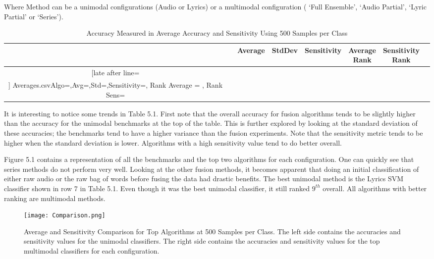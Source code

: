  Where Method can be a unimodal configurations (Audio or Lyrics) or a multimodal configuration 
 ( \lq Full Ensemble',  \lq Audio Partial', \lq Lyric Partial' or \lq Series').
 
\begin{table}
\centering
\footnotesize{
	\hskip-1.0in
	  \caption{Accuracy Measured in Average Accuracy and Sensitivity Using 500 Samples per Class }
	\begin{tabular}{| c | l | c | l | c  ||  c | c | c}\hline%
	& & Average & StdDev & Sensitivity &\pbox{20cm}{ Average\\ Rank \\} & \pbox{20cm}{ Sensitivity\\ Rank \\} \\\hline \csvreader[late after line=\\\hline]%
	{Averages.csv}{Algo=\name,Avg=\avg,Std=\std,Sensitivity=\mte, Rank Average = \ravg, Rank Sens=\rmonte}%
	{\thecsvrow &  \name & \avg & \std & \mte & \ravg & \rmonte}%
	\end{tabular}
}
\end{table}

\newpage

It is interesting to notice some trends in Table 5.1. First note that the overall accuracy for fusion 
algorithms tends to be slightly higher than the accuracy for the unimodal benchmarks at the 
top of the table.  This is further explored by looking at the standard deviation of these 
accuracies; the benchmarks tend to have a higher variance than the fusion experiments. 
Note that the sensitivity metric tends to be higher when the standard deviation is lower.  
Algorithms with a high sensitivity value tend to do better overall.


Figure 5.1 contains a representation of all the benchmarks and the top two algorithms for each configuration.  One can quickly see that 
series methods do not perform very well. Looking at the other fusion methods, it becomes apparent that doing an initial classification
 of either raw audio or the raw bag of words before fusing the data had drastic benefits.   The best unimodal method is the Lyrics SVM classifier shown in row 7 in Table 5.1. Even
 though it was the best unimodal classifier, it still ranked  $9^{th}$ overall. All algorithms with better ranking are multimodal methods. 

\begin{figure}
\centering
\texttt{[image: Comparison.png]}
\caption{Average and Sensitivity Comparison for Top Algorithms at 500 Samples per Class. The left side contains the accuracies and sensitivity values for the unimodal classifiers. The right side contains the accuracies and sensitivity values for the top multimodal classifiers for each configuration.}
\end{figure}

